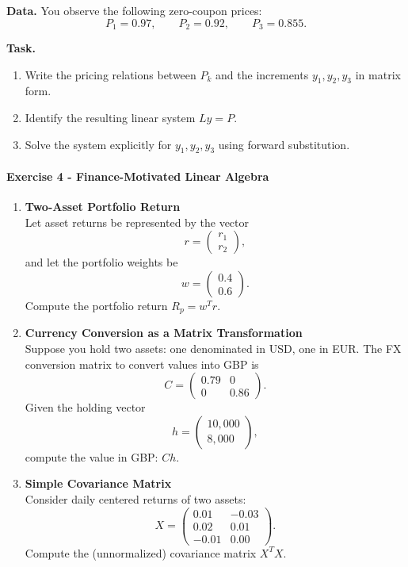 \documentclass[11pt]{article}
\begin{document}
\medskip

\textbf{Data.}
You observe the following zero-coupon prices:
\[
P_1=0.97,\qquad P_2=0.92,\qquad P_3=0.855.
\]

\medskip

\textbf{Task.}
\begin{enumerate}
    \item[(1)] Write the pricing relations between \(P_k\) and the increments \(y_1,y_2,y_3\) in matrix form.
    \item[(2)] Identify the resulting linear system \(Ly = P\).
    \item[(3)] Solve the system explicitly for \(y_1,y_2,y_3\) using forward substitution.
\end{enumerate}

\paragraph{Exercise 4 - Finance-Motivated Linear Algebra}
\begin{enumerate}
    \item \textbf{Two-Asset Portfolio Return}\\
    Let asset returns be represented by the vector
    \[
        r = \begin{pmatrix} r_1 \\ r_2 \end{pmatrix},
    \]
    and let the portfolio weights be
    \[
        w = \begin{pmatrix} 0.4 \\ 0.6 \end{pmatrix}.
    \]
    Compute the portfolio return $R_p = w^T r$.   

    \item \textbf{Currency Conversion as a Matrix Transformation}\\
    Suppose you hold two assets: one denominated in USD, one in EUR.  
    The FX conversion matrix to convert values into GBP is
    \[
        C = \begin{pmatrix}
        0.79 & 0 \\
        0 & 0.86
        \end{pmatrix}.
    \]
    Given the holding vector
    \[
        h = \begin{pmatrix} 10{,}000 \\ 8{,}000 \end{pmatrix},
    \]
    compute the value in GBP: $Ch$.

    \item \textbf{Simple Covariance Matrix}\\
    Consider daily centered returns of two assets:
    \[
        X = \begin{pmatrix}
        0.01 & -0.03 \\
        0.02 &  0.01 \\
        -0.01 & 0.00
        \end{pmatrix}.
    \]
    Compute the (unnormalized) covariance matrix $X^T X$.

\end{enumerate}
\end{document}
